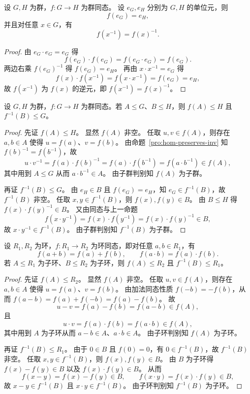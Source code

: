 \documentclass[lang=cn,a4paper,newtx]{elegantbook}
\begin{document}
\begin{proposition}\label{hom-preserves-inv}
设 $G,H$ 为群，$f:G\to H$ 为群同态。
设 $e_G,e_H$ 分别为 $G,H$ 的单位元，则
\[
  f(e_G)=e_H,
\]
并且对任意 $x\in G$，有
\[
  f(x^{-1})=f(x)^{-1}.
\]
\end{proposition}

\begin{proof}
由 $e_G\cdot e_G=e_G$ 得
\[
  f(e_G)\cdot f(e_G)=f(e_G\cdot e_G)=f(e_G).
\]
两边右乘 $f(e_G)^{-1}$ 得 $f(e_G)=e_H$。
再由 $x\cdot x^{-1}=e_G$ 得
\[
  f(x)\cdot f(x^{-1})=f(x\cdot x^{-1})=f(e_G)=e_H,
\]
故 $f(x^{-1})$ 为 $f(x)$ 的逆元，即 $f(x^{-1})=f(x)^{-1}$。
\end{proof}

\begin{proposition}
设 $G,H$ 为群，$f:G\to H$ 为群同态。若 $A\le G$、$B\le H$，则 $f(A)\le H$ 且 $f^{-1}(B)\le G$。
\end{proposition}

\begin{proof}
先证 $f(A)\le H$。
显然 $f(A)$ 非空。
任取 $u,v\in f(A)$，则存在 $a,b\in A$ 使得 $u=f(a)$、$v=f(b)$。
由命题~\ref{pro:hom-preserves-inv} 知 $f(b)^{-1}=f(b^{-1})$，故
\[
  u\cdot v^{-1}=f(a)\cdot f(b)^{-1}=f(a)\cdot f(b^{-1})=f(a\cdot b^{-1})\in f(A),
\]
其中用到 $A\le G$ 从而 $a\cdot b^{-1}\in A$。
由子群判别知 $f(A)$ 为子群。

再证 $f^{-1}(B)\le G$。
由 $e_H\in B$ 且 $f(e_G)=e_H$，知 $e_G\in f^{-1}(B)$，故 $f^{-1}(B)$ 非空。
任取 $x,y\in f^{-1}(B)$，则 $f(x),f(y)\in B$。
由 $B\le H$ 得 $f(x)\cdot f(y)^{-1}\in B$。
又由同态与上一命题
\[
  f(x\cdot y^{-1})=f(x)\cdot f(y^{-1})=f(x)\cdot f(y)^{-1}\in B,
\]
故 $x\cdot y^{-1}\in f^{-1}(B)$。
由子群判别知 $f^{-1}(B)$ 为子群。
\end{proof}

\begin{proposition}
设 $R_1,R_2$ 为环，$f:R_1\to R_2$ 为环同态，即对任意 $a,b\in R_1$，有
\[
  f(a+b)=f(a)+f(b),\qquad f(a\cdot b)=f(a)\cdot f(b).
\]
若 $A\le R_1$ 为子环、$B\le R_2$ 为子环，则 $f(A)\le R_2$ 且 $f^{-1}(B)\le R_1$。
\end{proposition}

\begin{proof}
先证 $f(A)\le R_2$。
显然 $f(A)$ 非空。
任取 $u,v\in f(A)$，则存在 $a,b\in A$ 使得 $u=f(a)$、$v=f(b)$。
由加法同态性质 $f(-b)=-f(b)$，从而 $f(a-b)=f(a)+f(-b)=f(a)-f(b)$。
故
\[
  u-v=f(a)-f(b)=f(a-b)\in f(A),
\]
且
\[
  u\cdot v=f(a)\cdot f(b)=f(a\cdot b)\in f(A),
\]
其中用到 $A$ 为子环从而 $a-b\in A$、$a\cdot b\in A$。
由子环判别知 $f(A)$ 为子环。

再证 $f^{-1}(B)\le R_1$。
由于 $0\in B$ 且 $f(0)=0$，有 $0\in f^{-1}(B)$，故 $f^{-1}(B)$ 非空。
任取 $x,y\in f^{-1}(B)$，则 $f(x),f(y)\in B$。
由 $B$ 为子环得 $f(x)-f(y)\in B$ 以及 $f(x)\cdot f(y)\in B$。
从而
\[
  f(x-y)=f(x)-f(y)\in B,\qquad f(x\cdot y)=f(x)\cdot f(y)\in B,
\]
故 $x-y\in f^{-1}(B)$ 且 $x\cdot y\in f^{-1}(B)$。
由子环判别知 $f^{-1}(B)$ 为子环。
\end{proof}
\end{document}
